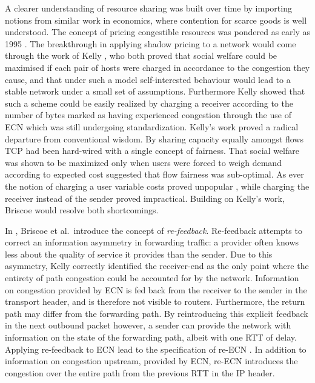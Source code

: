 A clearer understanding of resource sharing was built over time by importing notions from similar work in economics, where contention for scarce goods is well understood. 
The concept of pricing congestible resources was pondered as early as 1995 \cite{MacKieMason:1995p493}. 
The breakthrough in applying shadow pricing to a network would come through the work of Kelly \cite{Kelly:1998p139}, who both proved that social welfare could be maximised if each pair of hosts were charged in accordance to the congestion they cause, and that under such a model self-interested behaviour would lead to a stable network under a small set of assumptions.
Furthermore Kelly showed that such a scheme could be easily realized by charging a receiver according to the number of bytes marked as having experienced congestion through the use of \ac{ECN} which was still undergoing standardization.
Kelly's work proved a radical departure from conventional wisdom. 
By sharing capacity equally amongst flows \ac{TCP} had been hard-wired with a single concept of fairness.
That social welfare was shown to be maximized only when users were forced to weigh demand according to expected cost suggested that flow fairness was sub-optimal.
As ever the notion of charging a user variable costs proved unpopular \cite{Odlyzko:2004p290}, while charging the receiver instead of the sender proved impractical.
Building on Kelly's work, Briscoe would resolve both shortcomings.

In \cite{Briscoe:2005p346}, Briscoe et al.\ introduce the concept of \emph{re-feedback}.
Re-feedback attempts to correct an information asymmetry in forwarding traffic: a provider often knows less about the quality of service it provides than the sender.
Due to this asymmetry, Kelly correctly identified the receiver-end as the only point where the entirety of path congestion could be accounted for by the network.
Information on congestion provided by \ac{ECN} is fed back from the receiver to the sender in the transport header, and is therefore not visible to routers.
Furthermore, the return path may differ from the forwarding path.
By reintroducing this explicit feedback in the next outbound packet however, a sender can provide the network with information on the state of the forwarding path, albeit with one \ac{RTT} of delay.
Applying re-feedback to \ac{ECN} lead to the specification of re-\ac{ECN} \cite{Briscoe:2008p494}. 
In addition to information on congestion upstream, provided by \ac{ECN}, re-\ac{ECN} introduces the congestion over the entire path from the previous \ac{RTT} in the \ac{IP} header.

